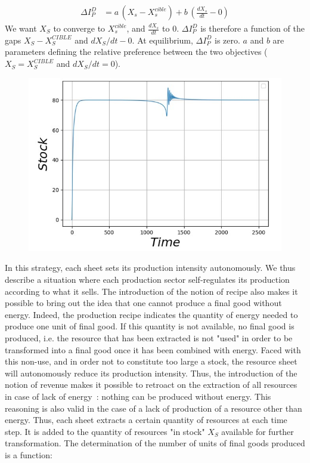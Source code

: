 \documentclass[12pt,a4paper]{article}%
\begin{document}
\begin{appendix}
\begin{align}
	\Delta I_{P}^{D} &= a \, (X_s-X_s^{cible}) + b \, (\frac{dX_s}{dt}-0)
\end{align}
We want $X_S$ to converge to $X_s^{cible}$, and $\frac{dX_s}{dt}$ to 0.
$\Delta I_{P}^{D}$ is therefore a function of the gaps $X_{S}-X_{S}^{CIBLE}$ and $dX_{S}/dt-0$. At equilibrium, $\Delta I_{P}^{D}$ is zero. $a$ and $b$ are parameters defining the relative preference between the two objectives ($X_{S}=X_{S}^{CIBLE}$ and $dX_{S}/dt=0$).  
\begin{figure}[h] 
	\centering \includegraphics[width=1.0\textwidth]{figures/Stock-t.jpg}
\end{figure} 
In this strategy, each sheet sets its production intensity autonomously. We thus describe a situation where each production sector self-regulates its production according to what it sells. The introduction of the notion of recipe also makes it possible to bring out the idea that one cannot produce a final good without energy. Indeed, the production recipe indicates the quantity of energy needed to produce one unit of final good. If this quantity is not available, no final good is produced, i.e. the resource that has been extracted is not "used" in order to be transformed into a final good once it has been combined with energy. Faced with this non-use, and in order not to constitute too large a stock, the resource sheet will autonomously reduce its production intensity. Thus, the introduction of the notion of revenue makes it possible to retroact on the extraction of all resources in case of lack of energy~: nothing can be produced without energy. This reasoning is also valid in the case of a lack of production of a resource other than energy.  Thus, each sheet extracts a certain quantity of resources at each time step. It is added to the quantity of resources "in stock" $X_{S}$ available for further transformation. The determination of the number of units of final goods produced is a function:

\end{appendix}
\end{document}
